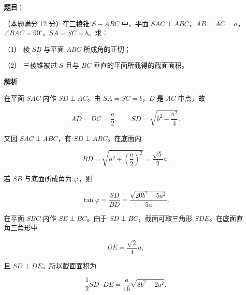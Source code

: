 \begin{answer}

\textbf{题目}：

（本题满分 12 分）在三棱锥 $S-ABC$ 中，平面 $SAC\perp ABC$，$AB=AC=a$，$\angle BAC=90^\circ$，$SA=SC=b$。求：

（1） 棱 $SB$ 与平面 $ABC$ 所成角的正切；

（2） 三棱锥被过 $S$ 且与 $BC$ 垂直的平面所截得的截面面积。
\nopagebreak[4]
\begin{center}\end{center}
\nopagebreak[4]
\textbf{解析}
\nopagebreak[4]
\begin{center}\end{center}
\nopagebreak[4]

在平面 $SAC$ 内作 $SD\perp AC$。由 $SA=SC=b$，$D$ 是 $AC$ 中点，故

\nopagebreak[4]
\[
AD=DC=\frac a2,\qquad
SD=\sqrt{b^2-\frac{a^2}{4}}.
\]

又因 $SAC\perp ABC$，有 $SD\perp ABC$。在底面内

\nopagebreak[4]
\[
BD=\sqrt{a^2+\left(\frac a2\right)^2}
=\frac{\sqrt5}{2}a.
\]

若 $SB$ 与底面所成角为 $\varphi$，则

\nopagebreak[4]
\[
\tan\varphi
=\frac{SD}{BD}
=\frac{\sqrt{20b^2-5a^2}}{5a}.
\]


在平面 $SBC$ 内作 $SE\perp BC$。由于 $SD\perp BC$，截面可取三角形 $SDE$。在底面直角三角形中

\nopagebreak[4]
\[
DE=\frac{\sqrt2}{4}a,
\]

且 $SD\perp DE$。所以截面面积为

\nopagebreak[4]
\[
\frac12SD\cdot DE
=\frac a{16}\sqrt{8b^2-2a^2}.
\]



\end{answer}
